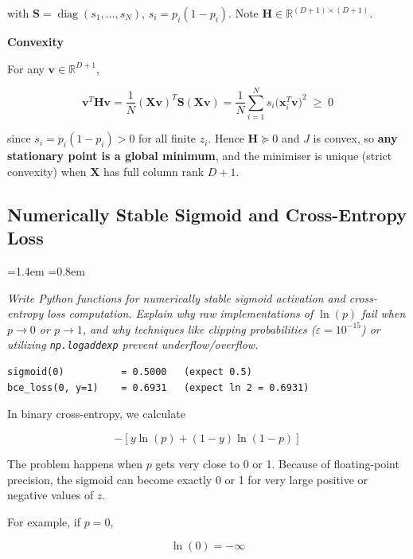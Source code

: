 \documentclass[12pt,a4paper]{article}
\newcommand{\qtext}[1]{%
  \begin{list}{}{\leftmargin=1.4em \rightmargin=0.8em
                 \topsep=3pt \parsep=0pt \itemsep=0pt}
  \item[]\itshape #1
  \end{list}}
\begin{document}
with $\mathbf{S} = \operatorname{diag}(s_1,\dots,s_N)$, $s_i = p_i(1-p_i)$. Note
$\mathbf{H} \in \mathbb{R}^{(D+1)\times(D+1)}$.

\textbf{Convexity}

For any $\mathbf{v} \in \mathbb{R}^{D+1}$,

\begin{equation*}
\mathbf{v}^{T}\mathbf{H}\mathbf{v}
= \frac{1}{N}(\mathbf{Xv})^{T}\mathbf{S}(\mathbf{Xv})
= \frac{1}{N}\sum_{i=1}^{N}s_i\big(\mathbf{x}_i^{T}\mathbf{v}\big)^{2} \;\ge\; 0
\end{equation*}

since $s_i = p_i(1-p_i) > 0$ for all finite $z_i$. Hence $\mathbf{H} \succeq 0$ and $J$ is convex,
so \textbf{any stationary point is a global minimum}, and the minimiser is unique (strict
convexity) when $\mathbf{X}$ has full column rank $D+1$.

\subsection{Numerically Stable Sigmoid and Cross-Entropy Loss}

\qtext{Write Python functions for numerically stable sigmoid activation and cross-entropy loss
computation. Explain why raw implementations of $\ln(p)$ fail when $p \to 0$ or $p \to 1$, and why
techniques like clipping probabilities ($\varepsilon = 10^{-15}$) or utilizing
\texttt{np.logaddexp} prevent underflow/overflow.}



\begin{lstlisting}[style=plainout]
sigmoid(0)          = 0.5000   (expect 0.5)
bce_loss(0, y=1)    = 0.6931   (expect ln 2 = 0.6931)
\end{lstlisting}

In binary cross-entropy, we calculate

\begin{equation}
-\left[y\ln(p)+(1-y)\ln(1-p)\right]
\label{eq:bceterm}
\end{equation}

The problem happens when $p$ gets very close to 0 or 1. Because of floating-point precision, the
sigmoid can become exactly 0 or 1 for very large positive or negative values of $z$.

For example, if $p=0$,

\begin{equation*}
\ln(0)=-\infty
\end{equation*}
\end{document}
